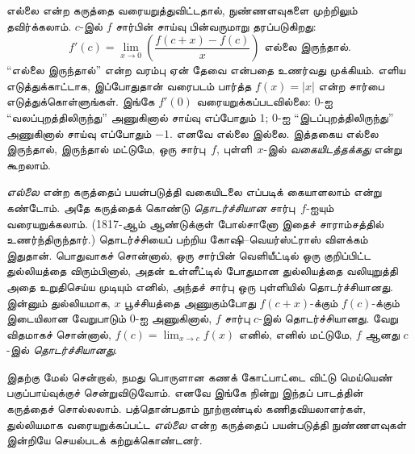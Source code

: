 \documentclass[../../../include/open-logic-section]{subfiles}
\begin{document}
எல்லை என்ற கருத்தை வரையறுத்துவிட்டதால், நுண்ணளவுகளை முற்றிலும்
தவிர்க்கலாம். $c$-இல் $f$ சார்பின் சாய்வு பின்வருமாறு தரப்படுகிறது:
\[
	{f}'(c) = \lim_{x \rightarrow 0}\left(\frac{f(c +x) - f(c)}{x}\right) \text{ எல்லை இருந்தால்}.
\]
“எல்லை இருந்தால்” என்ற வரம்பு ஏன் தேவை என்பதை உணர்வது முக்கியம்.
எளிய எடுத்துக்காட்டாக, இப்போதுதான் வரைபடம் பார்த்த $f(x) = |x|$
என்ற சார்பை எடுத்துக்கொள்ளுங்கள். இங்கே $f'(0)$ வரையறுக்கப்படவில்லை:
$0$-ஐ “வலப்புறத்திலிருந்து” அணுகினால் சாய்வு எப்போதும் $1$;
$0$-ஐ “இடப்புறத்திலிருந்து” அணுகினால் சாய்வு எப்போதும் $-1$.
எனவே எல்லை இல்லை. இத்தகைய எல்லை இருந்தால், இருந்தால் மட்டுமே,
ஒரு சார்பு~$f$, புள்ளி~$x$-இல் \emph{வகையிடத்தக்கது} என்று கூறலாம்.

\emph{எல்லை} என்ற கருத்தைப் பயன்படுத்தி வகையிடலை எப்படிக்
கையாளலாம் என்று கண்டோம். அதே கருத்தைக் கொண்டு \emph{தொடர்ச்சியான}
சார்பு~$f$-ஐயும் வரையறுக்கலாம். (1817-ஆம் ஆண்டுக்குள் போல்சானோ இதைச்
சாராம்சத்தில் உணர்ந்திருந்தார்.) தொடர்ச்சியைப் பற்றிய கோஷி--வெயர்ஸ்ட்ராஸ்
விளக்கம் இதுதான். பொதுவாகச் சொன்னால், ஒரு சார்பின் வெளியீட்டில்
ஒரு குறிப்பிட்ட துல்லியத்தை விரும்பினால், அதன் உள்ளீட்டில்
போதுமான துல்லியத்தை வலியுறுத்தி அதை உறுதிசெய்ய முடியும் எனில்,
அந்தச் சார்பு ஒரு புள்ளியில் தொடர்ச்சியானது. இன்னும் துல்லியமாக,
$x$ பூச்சியத்தை அணுகும்போது $f(c + x)$-க்கும் $f(c)$-க்கும்
இடையிலான வேறுபாடும் $0$-ஐ அணுகினால், $f$ சார்பு $c$-இல்
தொடர்ச்சியானது. வேறு விதமாகச் சொன்னால், $f(c) = \lim_{x \rightarrow c} f(x)$
எனில், எனில் மட்டுமே, $f$ ஆனது $c$-இல் \emph{தொடர்ச்சியானது}.

இதற்கு மேல் சென்றால், நமது பொருளான கணக் கோட்பாட்டை விட்டு மெய்யெண்
பகுப்பாய்வுக்குச் சென்றுவிடுவோம். எனவே இங்கே நின்று இந்தப் பாடத்தின்
கருத்தைச் சொல்லலாம். பத்தொன்பதாம் நூற்றாண்டில் கணிதவியலாளர்கள்,
துல்லியமாக வரையறுக்கப்பட்ட \emph{எல்லை} என்ற கருத்தைப் பயன்படுத்தி
நுண்ணளவுகள் இன்றியே செயல்படக் கற்றுக்கொண்டனர்.
\end{document}
